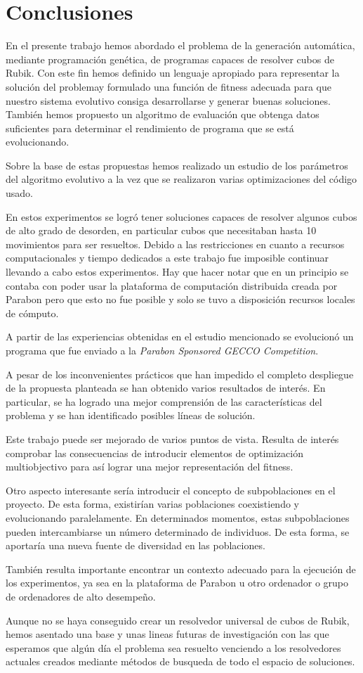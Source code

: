 \chapter{Conclusiones}\label{ch:concl}

En el presente trabajo hemos abordado el problema de la generación automática,
mediante programación genética, de programas capaces de resolver cubos de Rubik.
Con este fin hemos definido un lenguaje apropiado para representar la solución
del problemay formulado una función de fitness adecuada para que nuestro sistema
evolutivo consiga desarrollarse y generar buenas soluciones. También hemos
propuesto un algoritmo de evaluación que obtenga datos suficientes para
determinar el rendimiento de programa que se está evolucionando.

Sobre la base de estas propuestas hemos realizado un estudio de los parámetros
del algoritmo evolutivo a la vez que se realizaron varias optimizaciones del
código usado.

En estos experimentos se logró tener soluciones capaces de resolver algunos cubos
de alto grado de desorden, en particular cubos que necesitaban hasta 10
movimientos para ser resueltos. Debido a las restricciones en cuanto a recursos
computacionales y tiempo dedicados a este trabajo fue imposible continuar
llevando a cabo estos experimentos. Hay que hacer notar que en un principio se
contaba con poder usar la plataforma de computación distribuida creada por
Parabon pero que esto no fue posible y solo se tuvo a disposición recursos
locales de cómputo.

A partir de las experiencias obtenidas en el estudio mencionado se evolucionó un
programa que fue enviado a la \textit{Parabon Sponsored GECCO Competition}.

A pesar de los inconvenientes prácticos que han impedido el completo despliegue
de la propuesta planteada se han obtenido varios resultados de interés. En
particular, se ha logrado una mejor comprensión de las características del
problema y se han identificado posibles líneas de solución.

Este trabajo puede ser mejorado de varios puntos de vista. Resulta de interés
comprobar las consecuencias de introducir elementos de optimización
multiobjectivo para así lograr una mejor representación del fitness.

Otro aspecto interesante sería introducir el concepto de subpoblaciones en el
proyecto. De esta forma, existirían varias poblaciones coexistiendo y
evolucionando paralelamente. En determinados momentos, estas subpoblaciones pueden
intercambiarse un número determinado de individuos. De esta forma, se aportaría
una nueva fuente de diversidad en las poblaciones.

También resulta importante encontrar un contexto adecuado para la ejecución de
los experimentos, ya sea en la plataforma de Parabon u otro ordenador o grupo de
ordenadores de alto desempeño.

Aunque no se haya conseguido crear un resolvedor universal de cubos de Rubik,
hemos asentado una base y unas lineas futuras de investigación con las que
esperamos que algún día el problema sea resuelto venciendo a los resolvedores
actuales creados mediante métodos de busqueda de todo el espacio de soluciones.
